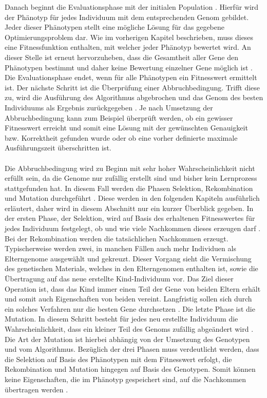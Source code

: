 Danach beginnt die Evaluationsphase mit der initialen Population \cite{rothlauf2006representation}. Hierfür wird der Phänotyp für jedes Individuum mit dem entsprechenden Genom gebildet. Jeder dieser Phänotypen stellt eine mögliche Lösung für das gegebene Optimierungsproblem dar. Wie im vorherigen Kapitel beschrieben, muss dieses eine Fitnessfunktion enthalten, mit welcher jeder Phänotyp bewertet wird. An dieser Stelle ist erneut hervorzuheben, dass die Gesamtheit aller Gene den Phänotypen bestimmt und daher keine Bewertung einzelner Gene möglich ist \cite{rothlauf2006representation}. Die Evaluationsphase endet, wenn für alle Phänotypen ein Fitnesswert ermittelt ist. Der nächste Schritt ist die Überprüfung einer Abbruchbedingung. Trifft diese zu, wird die Ausführung des Algorithmus abgebrochen und das Genom des besten Individuums als Ergebnis zurückgegeben \cite{weicker2015evolutionare}. Je nach Umsetzung der Abbruchbedingung kann zum Beispiel überprüft werden, ob ein gewisser Fitnesswert erreicht und somit eine Lösung mit der gewünschten Genauigkeit bzw. Korrektheit gefunden wurde oder ob eine vorher definierte maximale Ausführungszeit überschritten ist.
\\\\
Die Abbruchbedingung wird zu Beginn mit sehr hoher Wahrscheinlichkeit nicht erfüllt sein, da die Genome nur zufällig erstellt sind und bisher kein Lernprozess stattgefunden hat. In diesem Fall werden die Phasen Selektion, Rekombination und Mutation durchgeführt \cite{rothlauf2006representation}. Diese werden in den folgenden Kapiteln ausführlich erläutert, daher wird in diesem Abschnitt nur ein kurzer Überblick gegeben. In der ersten Phase, der Selektion, wird auf Basis des erhaltenen Fitnesswertes für jedes Individuum festgelegt, ob und wie viele Nachkommen dieses erzeugen darf \cite{weicker2015evolutionare}. Bei der Rekombination werden die tatsächlichen Nachkommen erzeugt. Typischerweise werden zwei, in manchen Fällen auch mehr Individuen als Elterngenome ausgewählt und gekreuzt. Dieser Vorgang sieht die Vermischung des genetischen Materials, welches in den Elterngenomen enthalten ist, sowie die Übertragung auf das neue erstellte Kind-Individuum vor. Das Ziel dieser Operation ist, dass das Kind immer einen Teil der Gene von beiden Eltern erhält und somit auch Eigenschaften von beiden vereint. Langfristig sollen sich durch ein solches Verfahren nur die besten Gene durchsetzen \cite{weicker2015evolutionare}. 
Die letzte Phase ist die Mutation. In diesem Schritt besteht für jedes neu erstellte Individuum die Wahrscheinlichkeit, dass ein kleiner Teil des Genoms zufällig abgeändert wird \cite{rojas1996neural}. Die Art der Mutation ist hierbei abhängig von der Umsetzung des Genotypen und vom Algorithmus. Bezüglich der drei Phasen muss verdeutlicht werden, dass die Selektion auf Basis des Phänotypen mit dem Fitnesswert erfolgt, die Rekombination und Mutation hingegen auf Basis des Genotypen. Somit können keine Eigenschaften, die im Phänotyp gespeichert sind, auf die Nachkommen übertragen werden \cite{rothlauf2006representation}.
